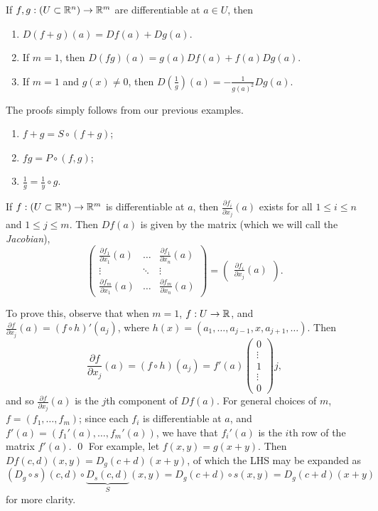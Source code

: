 \newpage
\begin{simplethm}
    If $f, g : (U \subset \mathbb R^n) \to \mathbb R^m$ are differentiable at $a \in U$, then
    \begin{enumerate}[label=(\alph*)]
        \item $D(f + g)(a) = Df(a) + Dg(a)$.
        \item If $m = 1$, then $D(fg)(a) = g(a) Df(a) + f(a) Dg(a)$.
        \item If $m = 1$ and $g(x) \neq 0$, then $D\left(\frac{1}{g}\right)(a) = -\frac{1}{g(a)^2} Dg(a)$.
    \end{enumerate}
\end{simplethm}
\noindent
The proofs simply follows from our previous examples.
\begin{enumerate}[label=(\alph*)]
    \item $f + g = S \circ (f + g)$;
    \item $fg = P \circ (f, g)$;
    \item $\frac{1}{g} = \frac{1}{y} \circ g$.
\end{enumerate}

\begin{simplethm}
    If $f : (U \subset \mathbb R^n) \to \mathbb R^m$ is differentiable at $a$, then $\frac{\partial f_i}{\partial x_j} (a)$ exists for all $1 \leq i \leq n$ and $1 \leq j \leq m$. Then $Df(a)$ is given by the matrix (which we will call the \textit{Jacobian}),
    \[ \begin{pmatrix} \frac{\partial f_1}{\partial x_1} (a) & \dots & \frac{\partial f_1}{\partial x_n} (a) \\ \vdots & \ddots & \vdots \\ \frac{\partial f_m}{\partial x_1} (a) & \dots & \frac{\partial f_m}{\partial x_n} (a) \end{pmatrix} = \begin{pmatrix} \frac{\partial f_i}{\partial x_j} (a) \end{pmatrix}. \]
\end{simplethm}
\noindent To prove this, observe that when $m = 1$, $f : U \to \mathbb R$, and $\frac{\partial f}{\partial x_j}(a) = (f \circ h)'(a_j)$, where $h(x) = (a_1, \dots, a_{j-1}, x, a_{j+1}, \dots)$. Then
\[ \frac{\partial f}{\partial x_j}(a) = (f \circ h)(a_j) = f'(a)\begin{pmatrix} 0 \\ \vdots \\ 1 \\ \vdots \\ 0 \end{pmatrix} j, \]
and so $\frac{\partial f}{\partial x_j}(a)$ is the $j$th component of $Df(a)$.
\medskip\newline
\noindent For general choices of $m$, $f = (f_1, \dots, f_m)$; since each $f_i$ is differentiable at $a$, and $f'(a) = (f_1'(a), \dots, f_m'(a))$, we have that $f_i'(a)$ is the $i$th row of the matrix $f'(a)$. \qed
\medskip\newline
\noindent For example, let $f(x, y) = g(x + y)$. Then $D f(c, d)(x, y) = D_g(c + d)(x + y)$, of which the LHS may be expanded as
\[ (D_g \circ s)(c, d) \circ \underbrace{D_s(c, d)}_{S} (x, y) = D_g(c + d) \circ s(x, y) = D_g(c + d)(x + y) \]
for more clarity.